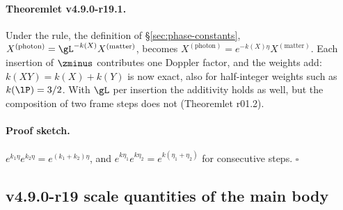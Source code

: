 \paragraph{Theoremlet v4.9.0-r19.1.}
Under the rule, the definition of \S\ref{sec:phase-constants}, \(X^{(\mathrm{photon})}=\gL^{-k(X)}X^{(\mathrm{matter})}\), becomes
\(X^{(\mathrm{photon})}=e^{-k(X)\eta}X^{(\mathrm{matter})}\).  Each insertion of \(\zminus\) contributes one Doppler factor, and the
weights add: \(k(XY)=k(X)+k(Y)\) is now exact, also for half-integer weights such as \(k(\lP)=3/2\).  With \(\gL\) per insertion the
additivity holds as well, but the composition of two frame steps does not (Theoremlet r01.2).

\paragraph{Proof sketch.}
\(e^{k_1\eta}e^{k_2\eta}=e^{(k_1+k_2)\eta}\), and \(e^{k\eta_1}e^{k\eta_2}=e^{k(\eta_1+\eta_2)}\) for consecutive steps.  \(\square\)

\subsection*{v4.9.0-r19 scale quantities of the main body}
\label{subsec:v490-r19-scale}

